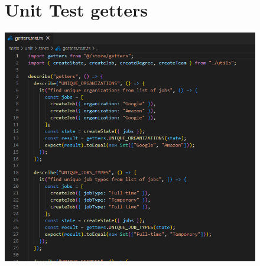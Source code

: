 \documentclass[ 4paper,11pt,openany]{book}
\begin{document}
\begin{figure}[htpb!] 
	\section{Unit Test getters}
	\centering 
	\includegraphics{getterTestExample.png}
\end{figure}
	
\end{document}
